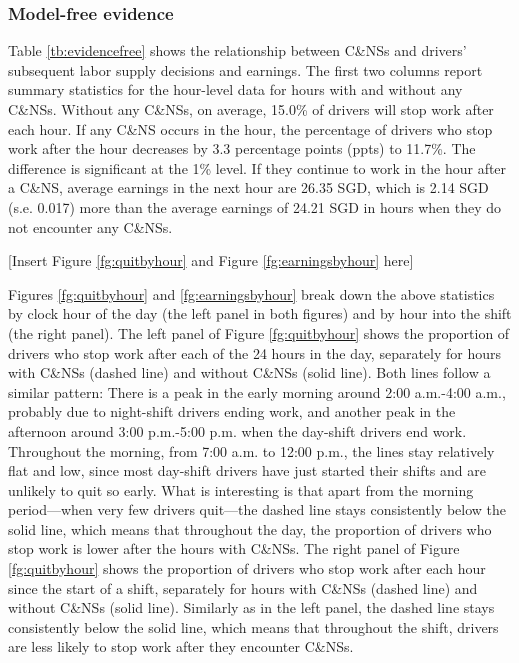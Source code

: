 \documentclass[reviewmode]{restud}
\begin{document}
\subsubsection{Model-free evidence}
Table \ref{tb:evidencefree} shows the relationship between C\&NSs and drivers' subsequent labor supply decisions and earnings. The first two columns report summary statistics for the hour-level data for hours with and without any C\&NSs. Without any C\&NSs, on average, 15.0\% of drivers will stop work after each hour.
If any C\&NS occurs in the hour, the percentage of drivers who stop work after the hour decreases by 3.3 percentage points (ppts) to 11.7\%. The difference is significant at the 1\% level. If they continue to work in the hour after a C\&NS, average earnings in the next hour are 26.35 SGD, which is 2.14 SGD (s.e. 0.017) more than the average earnings of 24.21 SGD in hours when they do not encounter any C\&NSs. 
\begin{center}
	[Insert Figure \ref{fg:quitbyhour} and Figure \ref{fg:earningsbyhour} here]
\end{center}


Figures \ref{fg:quitbyhour} and \ref{fg:earningsbyhour} break down the above  statistics by clock hour of the day (the left panel in both figures) and by hour into the shift (the right panel). The left panel of Figure \ref{fg:quitbyhour} shows the proportion of drivers who stop work after each of the 24 hours in the day, separately for hours with C\&NSs (dashed line) and without C\&NSs (solid line). Both lines follow a similar pattern: There is a peak in the early morning around 2:00 a.m.-4:00 a.m., probably due to night-shift drivers ending work, and another peak in the afternoon around 3:00 p.m.-5:00 p.m. when the day-shift drivers end work. Throughout the morning, from 7:00 a.m. to 12:00 p.m., the lines stay relatively flat and low, since most day-shift drivers have just started their shifts and are unlikely to quit so early. What is interesting is that apart from the morning period---when very few drivers quit---the dashed line stays consistently below the solid line, which means that throughout  the day, the proportion of drivers who stop work is lower after the hours with C\&NSs. The right panel of Figure \ref{fg:quitbyhour} shows the proportion of drivers who stop work after each hour since the start of a shift, separately for hours with C\&NSs (dashed line) and without C\&NSs (solid line). Similarly as in the left panel, the dashed line stays consistently below the solid line, which means that throughout the shift, drivers are less likely to stop work after they encounter C\&NSs.
\end{document}
